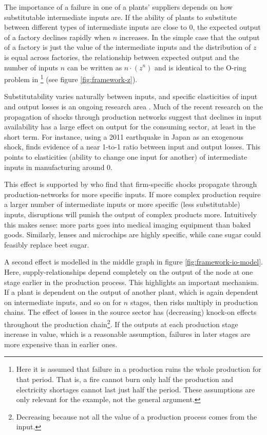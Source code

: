 \documentclass[11pt]{article}
\begin{document}
The importance of a failure in one of a plants' suppliers depends on how substitutable intermediate inputs are. If the ability of plants to substitute between different types of intermediate inputs are close to 0, the expected output of a factory declines rapidly when \(n\) increases. In the simple case that the output of a factory is just the value of the intermediate inputs and the distribution of \(z\) is equal across factories, the relationship between expected output and the number of inputs \(n\) can be written as \(n\cdot(z^{n})\) and is identical to the O-ring problem in \cite{kremer_o-ring_1993}\footnote{Here it is assumed that failure in a production ruins the whole production for that period. That is, a fire cannot burn only half the production and electricity shortages cannot last just half the period. These assumptions are only relevant for the example, not the general argument.} (see figure \ref{fig:framework-z}).

Substitutability varies naturally between inputs, and specific elasticities of input and output losses is an ongoing research area \citep{brummitt_contagious_2017,carvalho_micro_2014}. Much of the recent research on the propagation of shocks through production networks suggest that declines in input availability has a large effect on output for the consuming sector, at least in the short term. For instance, using a 2011 earthquake in Japan as an exogenous shock, \cite{boehm_input_2019-1} finds evidence of a near 1-to-1 ratio between input and output losses. This points to elasticities (ability to change one input for another) of intermediate inputs in manufacturing around 0.

This effect is supported by \cite{barrot_input_2016} who find that firm-specific shocks propagate through production-networks for more specific inputs. If more complex production require a larger number of intermediate inputs or more specific (less substitutable) inputs, disruptions will punish the output of complex products more. Intuitively this makes sense: more parts goes into medical imaging equipment than baked goods. Similarly, lenses and microchips are highly specific, while cane sugar could feasibly replace beet sugar.

A second effect is modelled in the middle graph in figure \ref{fig:framework-io-model}. Here, supply-relationships depend completely on the output of the node at one stage earlier in the production process. This highlights an important mechanism. If a plant is dependent on the output of another plant, which is again dependent on intermediate inputs, and so on for \(n\) stages, then risks multiply in production chains. The effect of losses in the source sector has (decreasing) knock-on effects throughout the production chain\footnote{Decreasing because not all the value of a production process comes from the input.}. If the outputs at each production stage increase in value, which is a reasonable assumption, failures in later stages are more expensive than in earlier ones.
\end{document}
